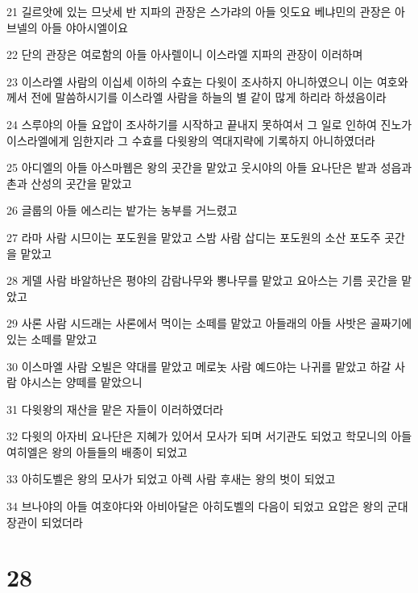 \par 21 길르앗에 있는 므낫세 반 지파의 관장은 스가랴의 아들 잇도요 베냐민의 관장은 아브넬의 아들 야아시엘이요
\par 22 단의 관장은 여로함의 아들 아사렐이니 이스라엘 지파의 관장이 이러하며
\par 23 이스라엘 사람의 이십세 이하의 수효는 다윗이 조사하지 아니하였으니 이는 여호와께서 전에 말씀하시기를 이스라엘 사람을 하늘의 별 같이 많게 하리라 하셨음이라
\par 24 스루야의 아들 요압이 조사하기를 시작하고 끝내지 못하여서 그 일로 인하여 진노가 이스라엘에게 임한지라 그 수효를 다윗왕의 역대지략에 기록하지 아니하였더라
\par 25 아디엘의 아들 아스마웹은 왕의 곳간을 맡았고 웃시야의 아들 요나단은 밭과 성읍과 촌과 산성의 곳간을 맡았고
\par 26 글룹의 아들 에스리는 밭가는 농부를 거느렸고
\par 27 라마 사람 시므이는 포도원을 맡았고 스밤 사람 삽디는 포도원의 소산 포도주 곳간을 맡았고
\par 28 게델 사람 바알하난은 평야의 감람나무와 뽕나무를 맡았고 요아스는 기름 곳간을 맡았고
\par 29 사론 사람 시드래는 사론에서 먹이는 소떼를 맡았고 아들래의 아들 사밧은 골짜기에 있는 소떼를 맡았고
\par 30 이스마엘 사람 오빌은 약대를 맡았고 메로놋 사람 예드야는 나귀를 맡았고 하갈 사람 야시스는 양떼를 맡았으니
\par 31 다윗왕의 재산을 맡은 자들이 이러하였더라
\par 32 다윗의 아자비 요나단은 지혜가 있어서 모사가 되며 서기관도 되었고 학모니의 아들 여히엘은 왕의 아들들의 배종이 되었고
\par 33 아히도벨은 왕의 모사가 되었고 아렉 사람 후새는 왕의 벗이 되었고
\par 34 브나야의 아들 여호야다와 아비아달은 아히도벨의 다음이 되었고 요압은 왕의 군대 장관이 되었더라

\chapter{28}

